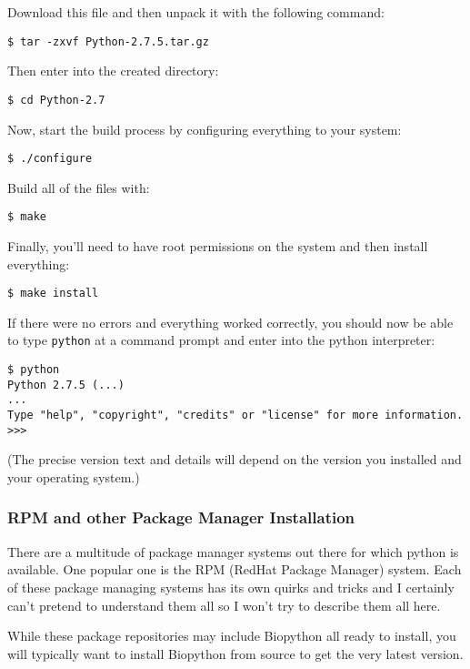 \documentclass{article}
\begin{document}
Download this file and then unpack it with the following command:

\begin{verbatim}
$ tar -zxvf Python-2.7.5.tar.gz
\end{verbatim}

Then enter into the created directory:

\begin{verbatim}
$ cd Python-2.7
\end{verbatim}

Now, start the build process by configuring everything to your system:

\begin{verbatim}
$ ./configure
\end{verbatim}

Build all of the files with:

\begin{verbatim}
$ make
\end{verbatim}

Finally, you'll need to have root permissions on the system and then
install everything:

\begin{verbatim}
$ make install
\end{verbatim}

If there were no errors and everything worked correctly, you should now
be able to type \verb|python| at a command prompt and enter into the
python interpreter:

\begin{verbatim}
$ python
Python 2.7.5 (...)
...
Type "help", "copyright", "credits" or "license" for more information.
>>>
\end{verbatim}

\noindent (The precise version text and details will depend on the version you installed and your operating system.)

\subsubsection{RPM and other Package Manager Installation}

There are a multitude of package manager systems out there for which
python is available. One popular one is the RPM (RedHat Package Manager)
system. Each of these package managing systems has its own quirks and
tricks and I certainly can't pretend to understand them all so I won't
try to describe them all here.

While these package repositories may include Biopython all ready to install,
you will typically want to install Biopython from source to get the very
latest version.
\end{document}
